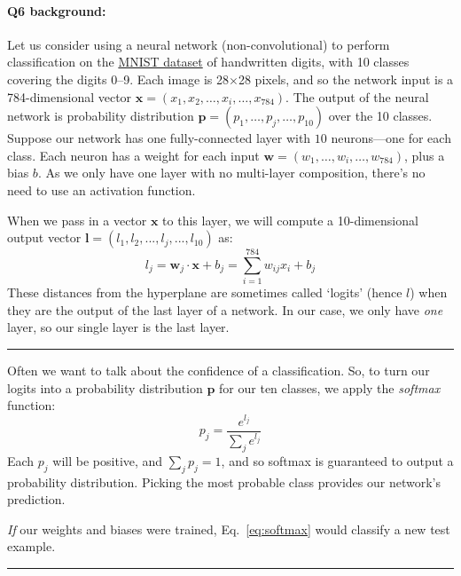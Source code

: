 \pagebreak
\paragraph{Q6 background:}
Let us consider using a neural network (non-convolutional) to perform classification on the \href{http://yann.lecun.com/exdb/mnist/}{MNIST dataset} of handwritten digits, with 10 classes covering the digits 0--9. Each image is 28$\times$28 pixels, and so the network input is a 784-dimensional vector $\mathbf{x}=(x_1,x_2,\dots,x_i,\dots,x_{784})$. The output of the neural network is probability distribution $\mathbf{p}=(p_1,\dots,p_j,\dots,p_{10})$ over the 10 classes. Suppose our network has one fully-connected layer with $10$ neurons---one for each class. Each neuron has a weight for each input $\mathbf{w}=(w_1,\dots,w_i,\dots,w_{784})$, plus a bias $b$. As we only have one layer with no multi-layer composition, there's no need to use an activation function.

When we pass in a vector $\mathbf{x}$ to this layer, we will compute a 10-dimensional output vector $\mathbf{l}=(l_1,l_2,...,l_j,...,l_{10})$ as:
\begin{equation}
    l_j = \mathbf{w}_j \cdot \mathbf{x} + b_j = \sum_{i=1}^{784}w_{ij}x_i + b_j
\end{equation}
These distances from the hyperplane are sometimes called `logits' (hence $l$) when they are the output of the last layer of a network. In our case, we only have \emph{one} layer, so our single layer is the last layer.

\hspace{\fill}\rule{0.5\linewidth}{.5pt}\hspace{\fill}

Often we want to talk about the confidence of a classification. So, to turn our logits into a probability distribution $\mathbf{p}$ for our ten classes, we apply the \emph{softmax} function:
\begin{equation}
    p_j = \frac{e^{l_j}}{\sum_je^{l_j}}
   \label{eq:softmax}
\end{equation}
Each $p_j$ will be positive, and $\sum_jp_j = 1$, and so softmax is guaranteed to output a probability distribution. Picking the most probable class provides our network's prediction.

\emph{If} our weights and biases were trained, Eq.~\ref{eq:softmax} would classify a new test example.

\hspace{\fill}\rule{0.5\linewidth}{.5pt}\hspace{\fill}

